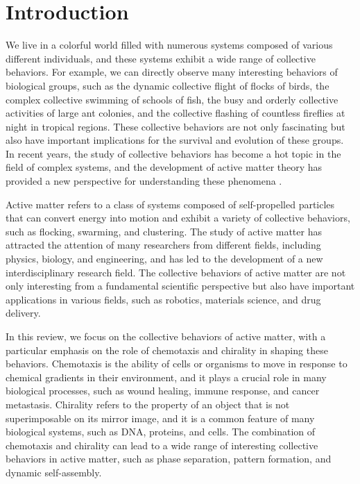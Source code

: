 \documentclass[a4paper, amsfonts, amssymb, amsmath, reprint, showkeys, showpacs, nofootinbib, twoside]{revtex4-2}
\begin{document}
\section{\label{sec:introduction}Introduction}

We live in a colorful world filled with numerous systems composed of various different individuals, and these systems exhibit a wide range of collective behaviors. For example, we can directly observe many interesting behaviors of biological groups, such as the dynamic collective flight of flocks of birds, the complex collective swimming of schools of fish, the busy and orderly collective activities of large ant colonies, and the collective flashing of countless fireflies at night in tropical regions. These collective behaviors are not only fascinating but also have important implications for the survival and evolution of these groups. In recent years, the study of collective behaviors has become a hot topic in the field of complex systems, and the development of active matter theory has provided a new perspective for understanding these phenomena \cite{Liebchen_2022,Liebchen_2018,PhysRevLett.127.238001,Ziepke2022,PhysRevLett.118.268001,PhysRevLett.119.058002,LU2025115794}.

Active matter refers to a class of systems composed of self-propelled particles that can convert energy into motion and exhibit a variety of collective behaviors, such as flocking, swarming, and clustering. The study of active matter has attracted the attention of many researchers from different fields, including physics, biology, and engineering, and has led to the development of a new interdisciplinary research field. The collective behaviors of active matter are not only interesting from a fundamental scientific perspective but also have important applications in various fields, such as robotics, materials science, and drug delivery.

In this review, we focus on the collective behaviors of active matter, with a particular emphasis on the role of chemotaxis and chirality in shaping these behaviors. Chemotaxis is the ability of cells or organisms to move in response to chemical gradients in their environment, and it plays a crucial role in many biological processes, such as wound healing, immune response, and cancer metastasis. Chirality refers to the property of an object that is not superimposable on its mirror image, and it is a common feature of many biological systems, such as DNA, proteins, and cells. The combination of chemotaxis and chirality can lead to a wide range of interesting collective behaviors in active matter, such as phase separation, pattern formation, and dynamic self-assembly.
\end{document}
